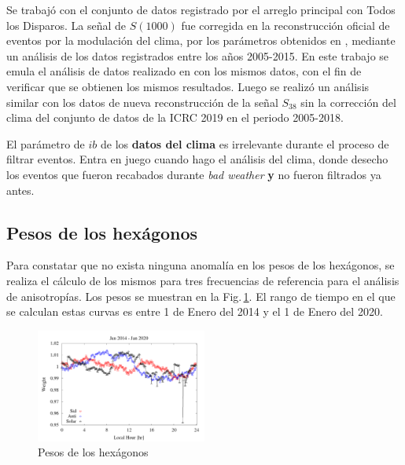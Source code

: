 


Se trabajó con el  conjunto de datos  registrado por el arreglo principal con Todos los Disparos. La señal de $S(1000)$ fue corregida en la reconstrucción oficial de eventos por la modulación del clima, por los parámetros obtenidos en \cite{aab2017impact}, mediante un análisis de los datos registrados  entre los años 2005-2015. En este trabajo se emula el análisis de datos realizado en \cite{aab2017impact} con los mismos datos, con el fin de verificar que se obtienen los mismos resultados. Luego se realizó un análisis similar con los datos de nueva reconstrucción de la señal $S_{38}$ sin la corrección del clima  del conjunto de datos de la ICRC 2019 en el periodo 2005-2018.

El parámetro de $ib$ de los \textbf{datos del clima} es irrelevante durante el proceso de filtrar eventos. Entra en juego cuando hago el análisis del clima, donde desecho los eventos que fueron recabados durante \emph{bad weather} \textbf{y} no fueron filtrados ya antes. 


\subsection{Pesos de los hexágonos}

Para constatar que no exista ninguna anomalía en los pesos de los hexágonos, se realiza el cálculo de los mismos para tres frecuencias de referencia para el análisis de anisotropías.  Los pesos se muestran en la Fig.\,\ref{fig:wei_14_20}. El rango de tiempo en el que se calculan estas curvas es entre 1 de Enero del 2014 y el 1 de Enero del 2020.

\begin{figure}[H]
	\centering
	\includegraphics[width=0.5\textwidth]{weigth2014-2020_jan.png} 	
	\caption{Pesos de los hexágonos}
	\label{fig:wei_14_20}
\end{figure}

